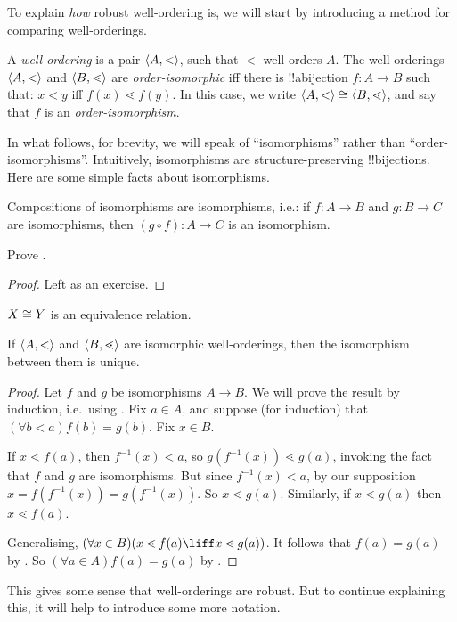 \documentclass[../../../include/open-logic-section]{subfiles}
\begin{document}

To explain \emph{how} robust well-ordering is, we will start by
introducing a method for comparing well-orderings.

\begin{defn}
A \emph{well-ordering} is a pair $\langle A, < \rangle$, such that $<$
well-orders $A$. The well-orderings $\langle A, < \rangle$ and $\langle B,
\lessdot \rangle$ are \emph{order-isomorphic} {iff} there is !!a{bijection}
$f \colon A \to B$ such that: $x < y$ iff $f(x) \lessdot  f(y)$. In
this case, we write $\langle A, < \rangle \cong \langle B, \lessdot \rangle$, and
say that $f$ is an \emph{order-isomorphism}.
\end{defn}
\noindent
In what follows, for brevity, we will speak of ``isomorphisms'' rather
than ``order-isomorphisms''. Intuitively, isomorphisms are
structure-preserving !!{bijection}s. Here are some simple facts about
isomorphisms.

\begin{lem}
Compositions of isomorphisms are isomorphisms, i.e.: if $f \colon A
\to B$ and $g \colon B \to C$ are isomorphisms, then $(g \circ f)
\colon A \to C$ is an isomorphism.
\end{lem}
\begin{prob}
	Prove .
\end{prob}
\begin{proof}
Left as an exercise.
\end{proof}
\begin{cor}
	$X \cong Y$ is an equivalence relation.
\end{cor}
\begin{prop}
If $\langle A, < \rangle$ and $\langle B, \lessdot \rangle$ are isomorphic
well-orderings, then the isomorphism between them is unique.
\end{prop}

\begin{proof}
Let $f$ and $g$ be isomorphisms $A \to B$. We will prove the result by induction, i.e.\ using . 
Fix $a\in A$, and suppose (for induction) that $(\forall b < a)f(b) = g(b)$. Fix $x \in B$. 

If $x \lessdot f(a)$, then $f^{-1}(x) < a$, so $g(f^{-1}(x)) \lessdot
g(a)$, invoking the fact that $f$ and $g$ are isomorphisms. But since
$f^{-1}(x) < a$, by our supposition $x =f(f^{-1}(x)) = g(f^{-1}(x))$.
So $x \lessdot g(a)$. Similarly, if $x \lessdot g(a)$ then $x \lessdot
f(a)$. 

Generalising, $(\forall x \in B)(x \lessdot f(a) \liff x \lessdot
g(a))$. It follows that $f(a) = g(a)$ by
. So $(\forall
a \in A)f(a) = g(a)$ by .
\end{proof}\noindent 
This gives some sense that well-orderings are robust. But to continue
explaining this, it will help to introduce some more notation. 
\end{document}
